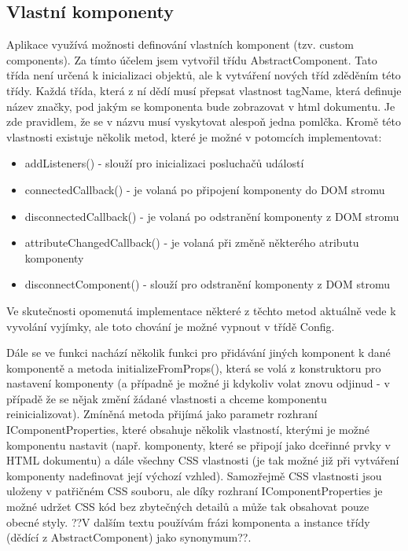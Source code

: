 \subsection*{Vlastní komponenty}
Aplikace využívá možnosti definování vlastních komponent (tzv. custom components). Za tímto účelem jsem vytvořil třídu AbstractComponent. Tato třída není určená k inicializaci objektů, ale k vytváření nových tříd zděděním této třídy. Každá třída, která z ní dědí musí přepsat vlastnost tagName, která definuje název značky, pod jakým se komponenta bude zobrazovat v html dokumentu. Je zde pravidlem, že se v názvu musí vyskytovat alespoň jedna pomlčka.
Kromě této vlastnosti existuje několik metod, které je možné v potomcích implementovat:
\begin{itemize}
    \item addListeners() - slouží pro inicializaci posluchačů událostí
    \item connectedCallback() - je volaná po připojení komponenty do DOM stromu
    \item disconnectedCallback() - je volaná po odstranění komponenty z DOM stromu
    \item attributeChangedCallback() - je volaná při změně některého atributu komponenty
    \item disconnectComponent() - slouží pro odstranění komponenty z DOM stromu
\end{itemize}

Ve skutečnosti opomenutá implementace některé z těchto metod aktuálně vede k vyvolání vyjímky, ale toto chování je možné vypnout v třídě Config.

Dále se ve funkci nachází několik funkci pro přidávání jiných komponent k dané komponentě a metoda initializeFromProps(), která se volá z konstruktoru pro nastavení komponenty (a případně je možné ji kdykoliv volat znovu odjinud - v případě že se nějak změní žádané vlastnosti a chceme komponentu reinicializovat). Zmíněná metoda přijímá jako parametr rozhraní IComponentProperties, které obsahuje několik vlastností, kterými je možné komponentu nastavit (např. komponenty, které se připojí jako dceřinné prvky v HTML dokumentu) a dále všechny CSS vlastnosti (je tak možné již při vytváření komponenty nadefinovat její výchozí vzhled). Samozřejmě CSS vlastnosti jsou uloženy v patřičném CSS souboru, ale díky rozhraní IComponentProperties je možné udržet CSS kód bez zbytečných detailů a může tak obsahovat pouze obecné styly. ??V dalším textu používám frázi komponenta a instance třídy (dědící z AbstractComponent) jako synonymum??.

